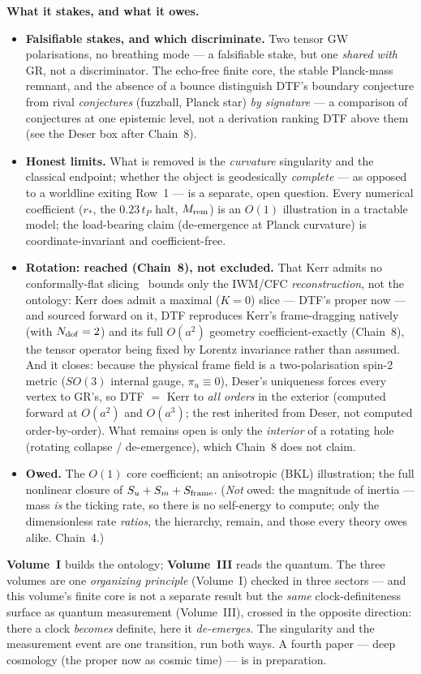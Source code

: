 \documentclass[11pt]{article}
\begin{document}
\textbf{What it stakes, and what it owes.}
\begin{itemize}[leftmargin=1.5em,itemsep=2pt,topsep=3pt]
  \item \textbf{Falsifiable stakes, and which discriminate.} Two tensor GW polarisations, no
    breathing mode --- a falsifiable stake, but one \emph{shared with} GR, not a discriminator. The
    echo-free finite core, the stable Planck-mass remnant, and the absence of a bounce distinguish DTF's
    boundary conjecture from rival \emph{conjectures} (fuzzball, Planck star) \emph{by signature} --- a
    comparison of conjectures at one epistemic level, not a derivation ranking DTF above them (see the Deser
    box after Chain~8).
  \item \textbf{Honest limits.} What is removed is the \emph{curvature} singularity and the classical
    endpoint; whether the object is geodesically \emph{complete} --- as opposed to a worldline exiting
    Row~1 --- is a separate, open question. Every numerical coefficient ($r_*$, the $0.23\,t_P$ halt,
    $M_{\rm rem}$) is an $O(1)$ illustration in a tractable model; the load-bearing claim (de-emergence at
    Planck curvature) is coordinate-invariant and coefficient-free.
  \item \textbf{Rotation: reached (Chain~8), not excluded.} That Kerr admits no conformally-flat
    slicing~\cite{GaratPrice2000} bounds only the IWM/CFC \emph{reconstruction}, not the ontology:
    Kerr does admit a maximal ($K=0$) slice --- DTF's
    proper now --- and sourced forward on it, DTF reproduces Kerr's frame-dragging natively (with $N_{\rm
    dof}=2$) and its full $O(a^2)$ geometry coefficient-exactly (Chain~8), the tensor operator being fixed by
    Lorentz invariance rather than assumed. And it closes: because the physical frame field is a
    two-polarisation spin-2 metric ($SO(3)$ internal gauge, $\pi_u\equiv0$), Deser's uniqueness forces every
    vertex to GR's, so DTF $=$ Kerr to \emph{all orders} in the exterior (computed forward at $O(a^2)$ and
    $O(a^3)$; the rest inherited from Deser, not computed order-by-order).
    What remains open is only the \emph{interior} of a rotating hole (rotating collapse / de-emergence),
    which Chain~8 does not claim.
  \item \textbf{Owed.} The $O(1)$ core coefficient; an anisotropic (BKL) illustration; the full nonlinear
    closure of $S_u+S_m+S_{\rm frame}$. (\emph{Not} owed: the magnitude of inertia ---
    mass \emph{is} the ticking rate, so there is no self-energy to compute; only the dimensionless rate
    \emph{ratios}, the hierarchy, remain, and those every theory owes alike. Chain~4.)
\end{itemize}
\noindent \textbf{Volume~I} builds the ontology; \textbf{Volume~III} reads the quantum. The three volumes
are one \emph{organizing principle} (Volume~I) checked in three sectors --- and this volume's finite core
is not a separate result but the \emph{same} clock-definiteness surface as quantum measurement
(Volume~III), crossed in the opposite direction: there a clock \emph{becomes} definite, here it
\emph{de-emerges}. The singularity and the measurement event are one transition, run both ways. A fourth
paper --- deep cosmology (the proper now as cosmic time) --- is in preparation.
\end{document}
